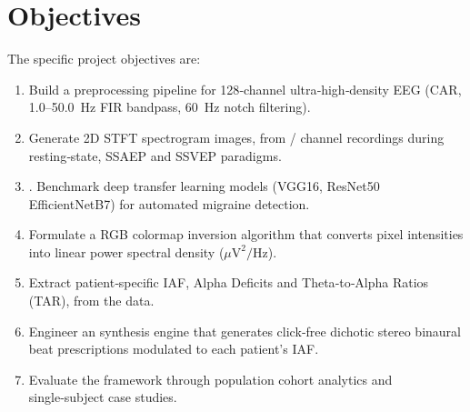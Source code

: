 \documentclass[12pt, a4paper]{report}
\begin{document}
\section{Objectives}
The specific project objectives are:
\begin{enumerate}
    \item Build a preprocessing pipeline for 128‑channel ultra‑high‑density EEG (CAR, 1.0–50.0~Hz FIR bandpass, 60~Hz notch filtering).
    \item Generate 2D STFT spectrogram images, from / channel recordings during resting‑state, SSAEP and SSVEP paradigms.
    \item. Benchmark deep transfer learning models (VGG16, ResNet50 EfficientNetB7) for automated migraine detection.
    \item Formulate a RGB colormap inversion algorithm that converts pixel intensities into linear power spectral density ($\mu\text{V}^2/\text{Hz}$).
    \item Extract patient‑specific IAF, Alpha Deficits and Theta‑to‑Alpha Ratios (TAR), from the data.
    \item Engineer an synthesis engine that generates click‑free dichotic stereo binaural beat prescriptions modulated to each patient’s IAF.
    \item Evaluate the framework through population cohort analytics and single‑subject case studies.
\end{enumerate}
\end{document}
